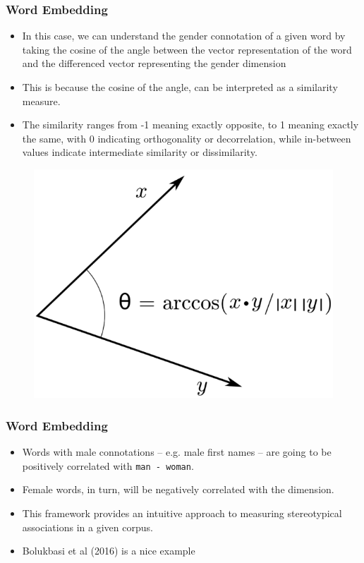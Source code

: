 \documentclass[
  shownotes,
  xcolor={svgnames},
  hyperref={colorlinks,citecolor=DarkBlue,linkcolor=DarkRed,urlcolor=DarkBlue}
  , aspectratio=169]{beamer}
\begin{document}
\begin{frame}
\frametitle{Word Embedding }

\begin{itemize}
  \item In this case, we can understand the gender connotation of a given word by taking the cosine of the angle between the vector representation of the word and the differenced vector representing the gender dimension 
  \medskip 
\item This is because the cosine of the angle, can be interpreted as a similarity measure.
\medskip
\item The similarity ranges from -1 meaning exactly opposite, to 1 meaning exactly the same, with 0 indicating orthogonality or decorrelation, while in-between values indicate intermediate similarity or dissimilarity. 
\end{itemize}

  \begin{figure}[H] \centering
            \captionsetup{justification=centering}
              \includegraphics[scale=0.14]{figures/Inner_product_angle.png}
              
 \end{figure}


\end{frame}
\begin{frame}
\frametitle{Word Embedding }
\begin{itemize}



\item Words with male connotations – e.g. male first names – are going to be positively correlated with \texttt{man - woman}.
\medskip
\item Female words, in turn, will be negatively correlated with the dimension.
\medskip
\item This framework provides an intuitive approach to measuring stereotypical associations in a given corpus. 
\medskip
\item Bolukbasi et al (2016) is a nice example
\end{itemize}

 \end{frame}
\end{document}
